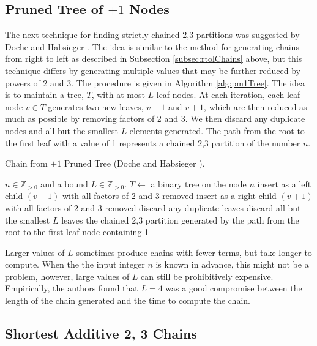 \documentclass{ucalgthes1}
\theoremstyle{definition}
\newcommand{\ZZgtz}{\mathbb{Z}_{>0}}
\begin{document}
\subsection{Pruned Tree of $\pm1$ Nodes}
\label{subsec:pm1Tree}

The next technique for finding strictly chained 2,3 partitions was suggested by Doche and Habsieger \cite{Doche2008}. The idea is similar to the method for generating chains from right to left as described in Subsection \ref{subsec:rtolChains} above, but this technique differs by generating multiple values that may be further reduced by powers of 2 and 3. The procedure is given in Algorithm \ref{alg:pm1Tree}.  The idea is to maintain a tree, $T$, with at most $L$ leaf nodes. At each iteration, each leaf node $v \in T$ generates two new leaves, $v-1$ and $v+1$, which are then reduced as much as possible by removing factors of 2 and 3.  We then discard any duplicate nodes and all but the smallest $L$ elements generated. The path from the root to the first leaf with a value of 1 represents a chained 2,3 partition of the number $n$.

\begin{algorithm}[h]
\caption{Chain from $\pm 1$ Pruned Tree (Doche and Habsieger \cite{Doche2008}).}
\label{alg:pm1Tree}
\begin{algorithmic}[1]
\REQUIRE $n \in \ZZgtz$ and a bound $L \in \ZZgtz$.
\STATE $T \gets$ a binary tree on the node $n$
		\STATE insert as a left child $(v - 1)$ with all factors of 2 and 3 removed
		\STATE insert as a right child $(v + 1)$ with all factors of 2 and 3 removed
	\ENDFOR
	\STATE discard any duplicate leaves
	\STATE discard all but the smallest $L$ leaves
\ENDWHILE
\RETURN the chained 2,3 partition generated by the path from the root to the first leaf node containing 1
\end{algorithmic}
\end{algorithm}

Larger values of $L$ sometimes produce chains with fewer terms, but take longer to compute.  When the the input integer $n$ is known in advance, this might not be a problem, however, large values of $L$ can still be prohibitively expensive.  Empirically, the authors found that $L=4$ was a good compromise between the length of the chain generated and the time to compute the chain. 


\subsection{Shortest Additive 2, 3 Chains}
\label{subsec:shortAddChains}
\end{document}
